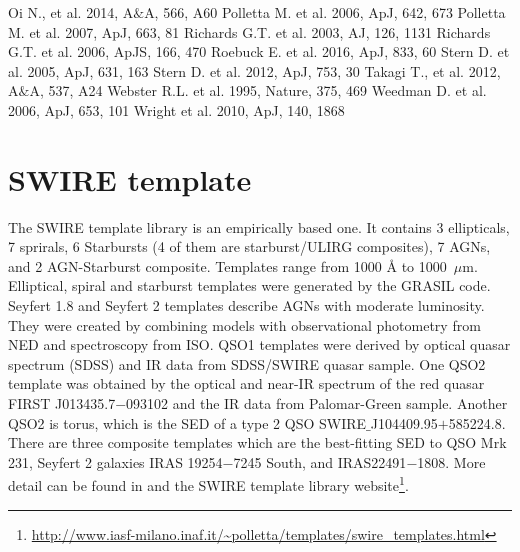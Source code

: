 \documentclass[a4paper,fleqn,usenatbib]{mnras}
\begin{document}
\begin{thebibliography}{99}
Oi N., et al. 2014, A$\&$A, 566, A60
Polletta M. et al. 2006, ApJ, 642, 673
Polletta M. et al. 2007, ApJ, 663, 81
Richards G.T. et al. 2003, AJ, 126, 1131
Richards G.T. et al. 2006, ApJS, 166, 470
Roebuck E. et al. 2016, ApJ, 833, 60
Stern D. et al. 2005, ApJ, 631, 163
Stern D. et al. 2012, ApJ, 753, 30
Takagi T., et al. 2012, A$\&$A, 537, A24
Webster R.L. et al. 1995, Nature, 375, 469
Weedman D. et al. 2006, ApJ, 653, 101
Wright et al. 2010, ApJ, 140, 1868


\end{thebibliography}



\appendix

\section{SWIRE template}
The SWIRE template library is an empirically based one. It contains 3 ellipticals, 7 sprirals, 6 Starbursts (4 of them are starburst/ULIRG composites), 7 AGNs, and 2 AGN-Starburst composite. Templates range from 1000 {\AA} to 1000~$\mu$m. Elliptical, spiral and starburst templates were generated by the GRASIL code. Seyfert 1.8 and Seyfert 2 templates describe AGNs with moderate luminosity. They were created by combining models with observational photometry from NED and spectroscopy from ISO. QSO1 templates were derived by optical quasar spectrum (SDSS) and IR data from SDSS/SWIRE quasar sample. One QSO2 template was obtained by the optical and near-IR spectrum of the red quasar FIRST J013435.7$-$093102 and the IR data from Palomar-Green sample. Another QSO2 is torus, which is the SED of a type 2 QSO SWIRE$\_$J104409.95$+$585224.8. There are three composite templates which are the best-fitting SED to QSO Mrk 231, Seyfert 2 galaxies IRAS 19254$-$7245 South, and IRAS22491$-$1808. More detail can be found in \citet{Polletta et al. 2007} and the SWIRE template library website\footnote{\url{http://www.iasf-milano.inaf.it/~polletta/templates/swire_templates.html}}. 





\bsp	%
\label{lastpage}
\end{document}

